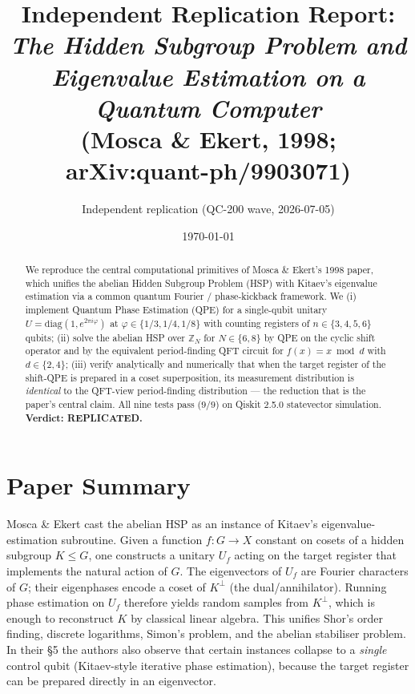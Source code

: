 \documentclass[11pt]{article}
\title{Independent Replication Report:\\
\textit{The Hidden Subgroup Problem and Eigenvalue Estimation on a Quantum Computer}\\
(Mosca \& Ekert, 1998; arXiv:quant-ph/9903071)}
\author{Independent replication (QC-200 wave, 2026-07-05)}
\date{\today}
\begin{document}
\maketitle

\begin{abstract}
We reproduce the central computational primitives of Mosca \& Ekert's 1998 paper,
which unifies the abelian Hidden Subgroup Problem (HSP) with Kitaev's eigenvalue
estimation via a common quantum Fourier / phase-kickback framework. We (i) implement
Quantum Phase Estimation (QPE) for a single-qubit unitary
$U=\mathrm{diag}(1,e^{2\pi i \varphi})$ at $\varphi\in\{1/3, 1/4, 1/8\}$ with counting
registers of $n\in\{3,4,5,6\}$ qubits; (ii) solve the abelian HSP over $\mathbb{Z}_N$
for $N\in\{6,8\}$ by QPE on the cyclic shift operator and by the equivalent
period-finding QFT circuit for $f(x)=x\bmod d$ with $d\in\{2,4\}$; (iii) verify
analytically and numerically that when the target register of the shift-QPE is
prepared in a coset superposition, its measurement distribution is \emph{identical}
to the QFT-view period-finding distribution --- the reduction that is the paper's
central claim. All nine tests pass ($9/9$) on Qiskit 2.5.0 statevector simulation.
\textbf{Verdict: REPLICATED.}
\end{abstract}

\section{Paper Summary}

Mosca \& Ekert cast the abelian HSP as an instance of Kitaev's eigenvalue-estimation
subroutine. Given a function $f:G\to X$ constant on cosets of a hidden subgroup
$K\le G$, one constructs a unitary $U_f$ acting on the target register that
implements the natural action of $G$. The eigenvectors of $U_f$ are Fourier
characters of $G$; their eigenphases encode a coset of $K^\perp$ (the dual/annihilator).
Running phase estimation on $U_f$ therefore yields random samples from $K^\perp$,
which is enough to reconstruct $K$ by classical linear algebra. This unifies Shor's
order finding, discrete logarithms, Simon's problem, and the abelian stabiliser
problem. In their \S 5 the authors also observe that certain instances collapse to a
\emph{single} control qubit (Kitaev-style iterative phase estimation), because the
target register can be prepared directly in an eigenvector.
\end{document}
